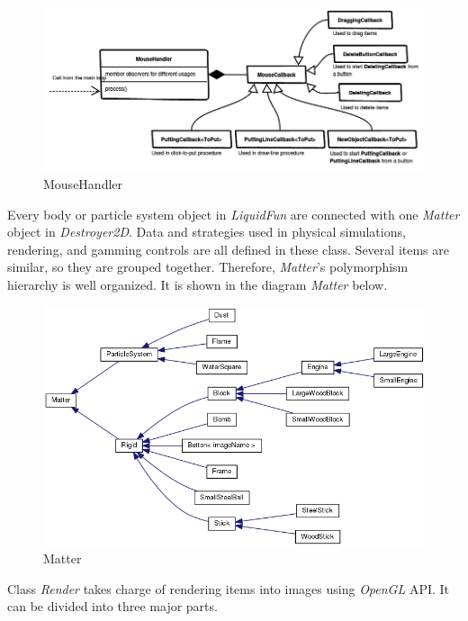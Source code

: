 \documentclass[UTF8]{ctexart}
\begin{document}
            \begin{figure}[htp]
                \centering
                \includegraphics[width=\textwidth]{mousehandler.png}
                \caption{MouseHandler}
            \end{figure}

            Every body or particle system object in \textit{LiquidFun} are connected with one \textit{Matter} object in \textit{Destroyer2D}. Data and strategies used in physical simulations, rendering, and gamming controls are all defined in these class. Several items are similar, so they are grouped together. Therefore, \textit{Matter}'s polymorphism hierarchy is well organized. It is shown in the diagram \textit{Matter} below.

            \begin{figure}[htp]
                \centering
                \includegraphics[width=\textwidth]{matter.png}
                \caption{Matter}
            \end{figure}

            Class \textit{Render} takes charge of rendering items into images using \textit{OpenGL} API. It can be divided into three major parts.
\end{document}

